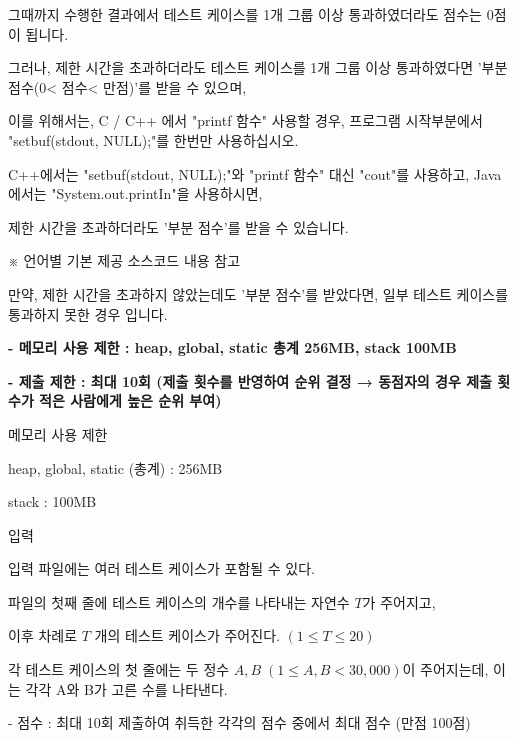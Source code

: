 \documentclass [12pt] {oblivoir}
\begin{document}
    그때까지 수행한 결과에서 테스트 케이스를 1개 그룹 이상 통과하였더라도 점수는 0점이 됩니다.

    그러나, 제한 시간을 초과하더라도 테스트 케이스를 1개 그룹 이상 통과하였다면 '부분 점수(0< 점수< 만점)'를 받을 수 있으며,

    이를 위해서는, C / C++ 에서 "printf 함수" 사용할 경우, 프로그램 시작부분에서 "setbuf(stdout, NULL);"를 한번만 사용하십시오.

    C++에서는 "setbuf(stdout, NULL);"와 "printf 함수" 대신 "cout"를 사용하고, Java에서는 "System.out.printIn"을 사용하시면,

    제한 시간을 초과하더라도 '부분 점수'를 받을 수 있습니다.

    ※ 언어별 기본 제공 소스코드 내용 참고

    만약, 제한 시간을 초과하지 않았는데도 '부분 점수'를 받았다면, 일부 테스트 케이스를 통과하지 못한 경우 입니다.

\vspace{3mm}

\textbf{- 메모리 사용 제한 : heap, global, static 총계 256MB, stack 100MB}

\textbf{- 제출 제한 : 최대 10회 (제출 횟수를 반영하여 순위 결정 → 동점자의 경우 제출 횟수가 적은 사람에게 높은 순위 부여)}

\vspace{5mm}

메모리 사용 제한

\vspace{3mm}

heap, global, static (총계) : 256MB

stack : 100MB

\vspace{5mm}

입력

\vspace{3mm}

입력 파일에는 여러 테스트 케이스가 포함될 수 있다.

파일의 첫째 줄에 테스트 케이스의 개수를 나타내는 자연수 $T$가 주어지고,

이후 차례로 $T$ 개의 테스트 케이스가 주어진다. $(1 \le T \le20)$

각 테스트 케이스의 첫 줄에는 두 정수 $A,B\;(1 \le A, B < 30,000)$이 주어지는데, 이는 각각 A와 B가 고른 수를 나타낸다.

\vspace{3mm}

- 점수 : 최대 10회 제출하여 취득한 각각의 점수 중에서 최대 점수 (만점 100점)
\end{document}
